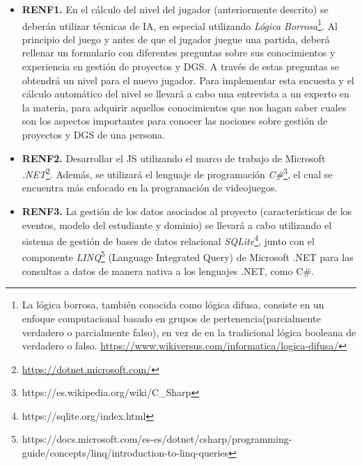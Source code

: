 \begin{itemize}
	\item \textbf{RENF1.} En el cálculo del nivel del jugador (anteriormente descrito) se deberán utilizar técnicas de IA, en especial utilizando \emph{Lógica Borrosa}\footnote{La lógica borrosa, también conocida como lógica difusa, consiste en un enfoque computacional basado en grupos de pertenencia(parcialmente verdadero o parcialmente falso), en vez de en la tradicional lógica booleana de verdadero o falso. \url{https://www.wikiversus.com/informatica/logica-difusa/}}. Al principio del juego y antes de que el jugador juegue una partida, deberá rellenar un formulario con diferentes preguntas sobre sus conocimientos y experiencia en gestión de proyectos y DGS. A través de estas preguntas se obtendrá un nivel para el nuevo jugador. Para implementar esta encuesta y el cálculo automático del nivel se llevará a cabo una entrevista a un experto en la materia, para adquirir aquellos conocimientos que nos hagan saber cuales son los aspectos importantes para conocer las nociones sobre gestión de proyectos y DGS de una persona.
	
	\item \textbf{RENF2.} Desarrollar el JS utilizando el marco de trabajo de Microsoft \emph{.NET}\footnote{\url{https://dotnet.microsoft.com/}}. Además, se utilizará el lenguaje de programación \emph{C\#}\footnote{https://es.wikipedia.org/wiki/C\_Sharp}, el cual se encuentra más enfocado en la programación de videojuegos.
	
	\item \textbf{RENF3.} La gestión de los datos asociados al proyecto (características de los eventos, modelo del estudiante y dominio) se llevará a cabo utilizando el sistema de gestión de bases de datos relacional \emph{SQLite}\footnote{https://sqlite.org/index.html}, junto con el componente \emph{LINQ}\footnote{https://docs.microsoft.com/es-es/dotnet/csharp/programming-guide/concepts/linq/introduction-to-linq-queries} (Language Integrated Query) de Microsoft .NET para las consultas a datos de manera nativa a los lenguajes .NET, como C\#.
\end{itemize}

\clearpage

